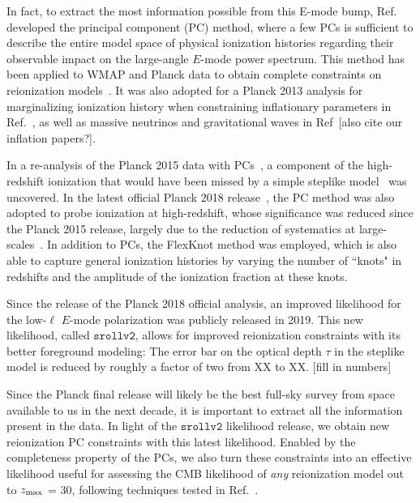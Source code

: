 \documentclass[prd,twocolumn,amsmath,amssymb,floatfix,superscriptaddress,nofootinbib]{revtex4-1}
\newcommand{\zmax}{z_{\rm max}}
\begin{document}
In fact, to extract the most information possible from this E-mode bump, Ref.~\cite{Hu:2003gh, Mortonson:2007hq} developed the principal component (PC) method, where a few PCs is sufficient to describe the entire model space of physical ionization histories regarding their observable impact on the large-angle $E$-mode power spectrum. This method has been applied to WMAP and Planck data to obtain complete constraints on reionization models~\cite{Mortonson:2008rx, Mortonson:2007hq, Heinrich:2016ojb, Aghanim:2018eyx}. It was also adopted for a Planck 2013 analysis for marginalizing ionization history when constraining inflationary parameters in Ref.~\cite{Planck:2013jfk}, as well as massive neutrinos and gravitational waves in Ref~\cite{Dai:2015dwa}[also cite our inflation papers?]. 

In a re-analysis of the Planck 2015 data with PCs~\cite{Heinrich:2016ojb}, a component of the high-redshift ionization that would have been missed by a simple steplike model~\cite{Heinrich:2016ojb} was uncovered. In the latest official Planck 2018 release~\cite{Aghanim:2018eyx}, the PC method was also adopted to probe ionization at high-redshift, whose significance was reduced since the Planck 2015 release, largely due to the reduction of systematics at large-scales~\cite{Aghanim:2018eyx, Heinrich:2018btc}. In addition to PCs, the FlexKnot method was employed, which is also able to capture general ionization histories by varying the number of ``knots" in redshifts and the amplitude of the ionization fraction at these knots. 

Since the release of the Planck 2018 official analysis, an improved likelihood for the low-$\ell$ $E$-mode polarization was publicly released in 2019. This new likelihood, called $\texttt{srollv2}$, allows for improved reionization constraints with its better foreground modeling: The error bar on the optical depth $\tau$ in the steplike model is reduced by roughly a factor of two from XX to XX. [fill in numbers]

Since the Planck final release will likely be the best full-sky survey from space available to us in the next decade, it is important to extract all the information present in the data. In light of the $\texttt{srollv2}$ likelihood release, we obtain new reionization PC constraints with this latest likelihood. Enabled by the completeness property of the PCs, we also turn these constraints into an effective likelihood useful for assessing the CMB likelihood of \textit{any} reionization model out to $\zmax$ = 30, following techniques tested in Ref.~\cite{Heinrich:2016ojb}. 
\end{document}
